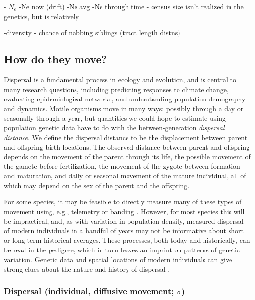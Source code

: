 \documentclass{ar-1col}
\begin{document}
       

        - $N_e$
            -Ne now (drift)
    -Ne avg
    -Ne through time
        - census size isn't realized in the genetics, but is relatively
   
    -diversity - chance of nabbing siblings (tract length distns)

\subsection{How do they move?}

Dispersal is a fundamental process in ecology and evolution,
and is central to many research questions,
including predicting responses to climate change,
evaluating epidemiological networks,
and understanding population demography and dynamics.
Motile organisms move in many ways:
possibly through a day or seasonally through a year, 
but quantities we could hope to estimate using population genetic data 
have to do with the between-generation \emph{dispersal distance}.
We define the dispersal distance to be the displacement 
between parent and offspring birth locations.
The observed distance between parent and offspring 
depends on the movement of the parent through its life, 
the possible movement of the gamete before fertilization,
the movement of the zygote between formation and maturation, 
and daily or seasonal movement of the mature individual, 
all of which may depend on the sex of the parent and the offspring.


For some species, 
it may be feasible to directly measure many of these types of movement
using, e.g., telemetry or banding \cite{dispersal_estimation}.
However, for most species this will be impractical,
and, as with variation in population density, 
measured dispersal of modern individuals in a handful of years 
may not be informative about short or long-term historical averages.
These processes, 
both today and historically, 
can be read in the pedigree, 
which in turn leaves an imprint on patterns of genetic variation.
Genetic data and spatial locations of modern individuals
can give strong clues about the nature and history of dispersal \cite{Cayuela2018}.

\subsubsection{Dispersal (individual, diffusive movement; $\sigma$)}
\end{document}
